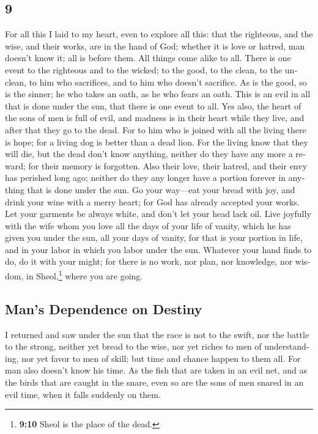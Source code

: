 \begin{paracol}{2}
\begin{otherlanguage}{english}
\hypertarget{section-17}{%
\section{9}\label{section-17}}

 For all this I laid to my heart, even to explore all
this: that the righteous, and the wise, and their works, are in the hand
of God; whether it is love or hatred, man doesn't know it; all is before
them.  All things come alike to all. There is one event to
the righteous and to the wicked; to the good, to the clean, to the
unclean, to him who sacrifices, and to him who doesn't sacrifice. As is
the good, so is the sinner; he who takes an oath, as he who fears an
oath.  This is an evil in all that is done under the sun,
that there is one event to all. Yes also, the heart of the sons of men
is full of evil, and madness is in their heart while they live, and
after that they go to the dead.  For to him who is joined
with all the living there is hope; for a living dog is better than a
dead lion.  For the living know that they will die, but
the dead don't know anything, neither do they have any more a reward;
for their memory is forgotten.  Also their love, their
hatred, and their envy has perished long ago; neither do they any longer
have a portion forever in anything that is done under the sun.
 Go your way---eat your bread with joy, and drink your
wine with a merry heart; for God has already accepted your works.
 Let your garments be always white, and don't let your
head lack oil.  Live joyfully with the wife whom you love
all the days of your life of vanity, which he has given you under the
sun, all your days of vanity, for that is your portion in life, and in
your labor in which you labor under the sun.  Whatever
your hand finds to do, do it with your might; for there is no work, nor
plan, nor knowledge, nor wisdom, in Sheol,\footnote{\textbf{9:10} Sheol
  is the place of the dead.} where you are going.

\hypertarget{mans-dependence-on-destiny}{%
\subsection{Man's Dependence on
Destiny}\label{mans-dependence-on-destiny}}

 I returned and saw under the sun that the race is not to
the swift, nor the battle to the strong, neither yet bread to the wise,
nor yet riches to men of understanding, nor yet favor to men of skill;
but time and chance happen to them all.  For man also
doesn't know his time. As the fish that are taken in an evil net, and as
the birds that are caught in the snare, even so are the sons of men
snared in an evil time, when it falls suddenly on them.


\end{otherlanguage}
\end{paracol}
